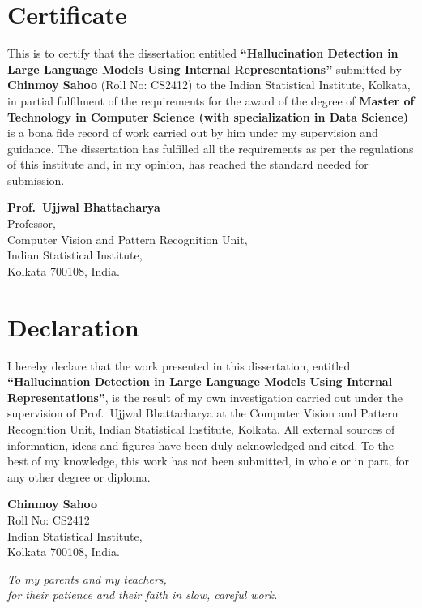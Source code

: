 \documentclass[12pt,a4paper,oneside]{report}
\begin{document}
\chapter*{Certificate}
\thispagestyle{plain}
\vspace{0.5cm}
This is to certify that the dissertation entitled \textbf{``Hallucination Detection
in Large Language Models Using Internal Representations''} submitted by
\textbf{Chinmoy Sahoo} (Roll No: CS2412) to the Indian Statistical Institute,
Kolkata, in partial fulfilment of the requirements for the award of the degree of
\textbf{Master of Technology in Computer Science (with specialization in Data
Science)} is a bona fide record of work carried out by him under my supervision and
guidance. The dissertation has fulfilled all the requirements as per the regulations
of this institute and, in my opinion, has reached the standard needed for submission.
\vspace{2.5cm}
\noindent
\begin{flushright}
\textbf{Prof.\ Ujjwal Bhattacharya}\\
Professor,\\
Computer Vision and Pattern Recognition Unit,\\
Indian Statistical Institute,\\
Kolkata 700108, India.
\end{flushright}
\chapter*{Declaration}
\thispagestyle{plain}
\vspace{0.5cm}
I hereby declare that the work presented in this dissertation, entitled
\textbf{``Hallucination Detection in Large Language Models Using Internal
Representations''}, is the result of my own investigation carried out under the
supervision of Prof.\ Ujjwal Bhattacharya at the Computer Vision and Pattern
Recognition Unit, Indian Statistical Institute, Kolkata. All external sources of
information, ideas and figures have been duly acknowledged and cited. To the best of
my knowledge, this work has not been submitted, in whole or in part, for any other
degree or diploma.
\vspace{2.5cm}
\noindent
\begin{flushright}
\textbf{Chinmoy Sahoo}\\
Roll No: CS2412\\
Indian Statistical Institute,\\
Kolkata 700108, India.
\end{flushright}
\clearpage
\thispagestyle{plain}
\vspace*{6cm}
\begin{center}
\textit{To my parents and my teachers,\\[0.3cm]
for their patience and their faith in slow, careful work.}
\end{center}
\end{document}
